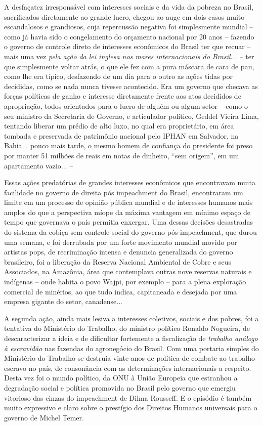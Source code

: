 A desfaçatez irresponsável com interesses sociais e da vida da pobreza
no Brasil, sacrificados diretamente ao grande lucro, chegou ao auge em
dois casos muito escandalosos e grandiosos, cuja repercussão negativa
foi simplesmente mundial -- como já havia sido o congelamento do
orçamento nacional por 20 anos -- fazendo o governo de controle direto
de interesses econômicos do Brasil ter que recuar -- mais uma vez
\emph{pela ação} \emph{da lei inglesa nos mares internacionais do
Brasil... --} ter que simplesmente voltar atrás, o que ele fez com a
pura máscara de cara de pau, como lhe era típico, desfazendo de um dia
para o outro as ações tidas por decididas, como se nada nunca tivesse
acontecido. Era um governo que checava as forças políticas de ganho e
interesse diretamente frente aos atos decididos de apropriação, todos
orientados para o lucro de alguém ou algum setor -- como o seu ministro
da Secretaria de Governo, e articulador político, Geddel Vieira Lima,
tentando liberar um prédio de alto luxo, no qual era proprietário, em
área tombada e preservada de patrimônio nacional pelo IPHAN em Salvador,
na Bahia... pouco mais tarde, o mesmo homem de confiança do presidente
foi preso por manter 51 milhões de reais em notas de dinheiro, ``sem
origem'', em um apartamento vazio... --

Essas ações predatórias de grandes interesses econômicos que encontravam
muita facilidade no governo de direita pós impeachment do Brasil,
encontraram um limite em um processo de opinião pública mundial e de
interesses humanos mais amplos do que a perspectiva míope da máxima
vantagem em mínimo espaço de tempo que governava o país permitia
enxergar. Uma dessas decisões desastradas do sistema da cobiça sem
controle social do governo pós-impeachment, que durou uma semana, e foi
derrubada por um forte movimento mundial movido por artistas pops, de
recriminação intensa e denuncia generalizada do governo brasileiro, foi
a liberação da Reserva Nacional Ambiental de Cobre e seus Associados, na
Amazônia, área que contemplava outras nove reservas naturais e indígenas
-- onde habita o povo Wajpi, por exemplo -- para a plena exploração
comercial de minérios, ao que tudo indica, capitaneada e desejada por
uma empresa gigante do setor, canadense...

A segunda ação, ainda mais lesiva a interesses coletivos, sociais e dos
pobres, foi a tentativa do Ministério do Trabalho, do ministro político
Ronaldo Nogueira, de descaracterizar a ideia e de dificultar fortemente
a fiscalização de \emph{trabalho análogo à escravidão} nas fazendas do
agronegócio do Brasil. Com uma portaria simples do Ministério do
Trabalho se destruía vinte anos de política de combate ao trabalho
escravo no país, de consonância com as determinações internacionais a
respeito. Desta vez foi o mundo político, da ONU à União Europeia que
estranhou a degradação social e política promovida no Brasil pelo
governo que emergiu vitorioso das cinzas do impeachment de Dilma
Rousseff. E o episódio é também muito expressivo e claro sobre o
prestígio dos Direitos Humanos universais para o governo de Michel
Temer.

